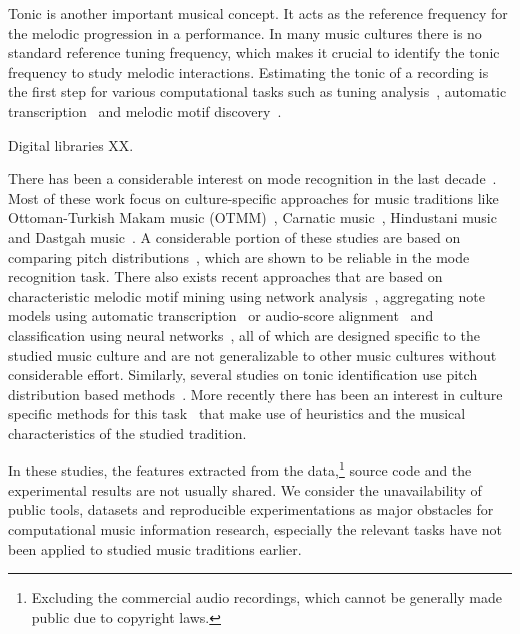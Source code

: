 \documentclass{sig-alternate}
\begin{document}
Tonic is another important musical concept. It acts as the reference frequency for the melodic progression in a performance. In many music cultures there is no standard reference tuning frequency, which makes it crucial to identify the tonic frequency to study melodic interactions. Estimating the tonic of a recording is the first step for various computational tasks such as tuning analysis~\cite{tuning}, automatic transcription~\cite{transcription} and melodic motif discovery~\cite{gulati_network}.

Digital libraries XX. 

There has been a considerable interest on mode recognition in the last decade~\cite{koduri2012ragaReview}. Most of these work focus on culture-specific approaches for music traditions like Otto\-man-Turkish Makam music (OTMM)~\cite{bozkurt_makam}, Carnatic music~\cite{dighe, dighe2, gulati_network}, Hindustani music~\cite{chordia2, chordia,gulati2016raga} and Dastgah music~\cite{dastgah}. A considerable portion of these studies are based on comparing pitch distributions~\cite{chordia2, chordia, dighe, dighe2, bozkurt_makam}, which are shown to be reliable in the mode recognition task. There also exists recent approaches that are based on characteristic melodic motif mining using network analysis~\cite{gulati2016raga,gulati_network}, aggregating note models using automatic transcription~\cite{koduri2014intonation} or audio-score alignment~\cite{senturk2016noteModel_smc} and classification using neural networks~\cite{raga_mining, neural_raga_chapter}, all of which are designed specific to the studied music culture and are not generalizable to other music cultures without considerable effort. Similarly, several studies on tonic identification use pitch distribution based methods~\cite{bozkurt_tonic, chordia}. More recently there has been an interest in culture specific methods for this task~\cite{sercan_tonic, sankalp_tonic, senturk2013karar_ismir} that make use of heuristics and the musical characteristics of the studied tradition. 

In these studies, the features extracted from the data,\footnote{Excluding the commercial audio recordings, which cannot be generally made public due to copyright laws.} source code and the experimental results are not usually shared. We consider the unavailability of public tools, data\-sets and reproducible experimentations as major obstacles for computational music information research, especially the relevant tasks have not been applied to studied music traditions earlier.
\end{document}
